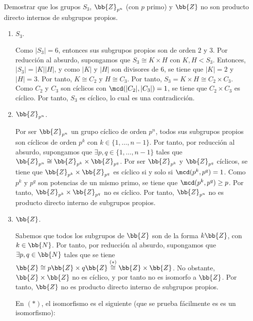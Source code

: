 \begin{ejercicio}
    Demostrar que los grupos $S_3$, $\bb{Z}_{p^n}$ (con $p$ primo) y $\bb{Z}$ no son producto directo internos de subgrupos propios.
    \begin{enumerate}
        \item $S_3$.
        
        Como $|S_3|=6$, entonces sus subgrupos propios son de orden $2$ y $3$. 
        Por reducción al absurdo, supongamos que $S_3\cong K\times H$ con $K,H<S_3$. Entonces, $|S_3|=|K||H|$, y como $|K|$ y $|H|$ son divisores de $6$, se tiene que $|K|=2$ y $|H|=3$. Por tanto, $K\cong C_2$ y $H\cong C_3$. Por tanto, $S_3=K\times H\cong C_2\times C_3$. Como $C_2$ y $C_3$ son cíclicos con $\mcd(|C_2|,|C_3|)=1$, se tiene que $C_2\times C_3$ es cíclico. Por tanto, $S_3$ es cíclico, lo cual es una contradicción.

        \item $\bb{Z}_{p^n}$.
        
        Por ser $\bb{Z}_{p^n}$ un grupo cíclico de orden $p^n$, todos sus subgrupos propios son cíclicos de orden $p^k$ con $k\in \{1,\ldots,n-1\}$. Por tanto, por reducción al absurdo, supongamos que $\exists p,q\in \{1,\ldots,n-1\}$ tales que $\bb{Z}_{p^n}\cong \bb{Z}_{p^k}\times \bb{Z}_{p^q}$. Por ser $\bb{Z}_{p^k}$ y $\bb{Z}_{p^q}$ cíclicos, se tiene que $\bb{Z}_{p^k}\times \bb{Z}_{p^q}$ es cíclico si y solo si $\mcd(p^k,p^q)=1$. Como $p^k$ y $p^q$ son potencias de un mismo primo, se tiene que $\mcd(p^k,p^q)\geq p$. Por tanto, $\bb{Z}_{p^k}\times \bb{Z}_{p^q}$ no es cíclico. Por tanto, $\bb{Z}_{p^n}$ no es producto directo interno de subgrupos propios.

        \item $\bb{Z}$.
        
        Sabemos que todos los subgrupos de $\bb{Z}$ son de la forma $k\bb{Z}$, con $k\in \bb{N}$. Por tanto, por reducción al absurdo, supongamos que $\exists p,q\in \bb{N}$ tales que se tiene $\bb{Z}\cong p\bb{Z}\times q\bb{Z}\stackrel{(\ast)}{\cong} \bb{Z}\times \bb{Z}$. No obstante, $\bb{Z}\times \bb{Z}$ no es cíclico, y por tanto no es isomorfo a $\bb{Z}$. Por tanto, $\bb{Z}$ no es producto directo interno de subgrupos propios.

        En $(\ast)$, el isomorfismo es el siguiente (que se prueba fácilmente es es un isomorfismo):
    \end{enumerate}
\end{ejercicio}



